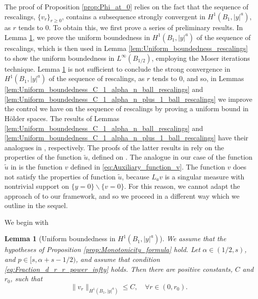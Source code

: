 \documentclass[11pt,reqno]{amsart}
\newtheorem{lem}[thm]{Lemma}
\theoremstyle{definition}
\theoremstyle{remark}
\begin{document}
The proof of Proposition \ref{prop:Phi_at_0} relies on the fact that the sequence of rescalings, $\{v_r\}_{r \geq 0}$, contains a subsequence strongly convergent in $H^1(B_1,|y|^a)$, as $r$ tends to $0$. To obtain this, we first prove a series of preliminary results. In Lemma \ref{lem:Uniform_boundedness_H_1_rescalings}, we prove the uniform boundedness in $H^1(B_1,|y|^a)$ of the sequence of rescalings, which is then used in Lemma \ref{lem:Uniform_boundedness_rescalings} to show the uniform boundedness in $L^{\infty}(B_{1/2})$, employing the Moser iterations technique. Lemma \ref{lem:Uniform_boundedness_H_1_rescalings} is not sufficient to conclude the strong convergence in $H^1(B_1,|y|^a)$ of the sequence of rescalings, as $r$ tends to $0$, and so, in Lemmas \ref{lem:Uniform_boundedness_C_1_alpha_n_ball_rescalings} and \ref{lem:Uniform_boundedness_C_1_alpha_n_plus_1_ball_rescalings} we improve the control we have on the sequence of rescalings by proving a uniform bound in H\"older spaces. The results of Lemmas \ref{lem:Uniform_boundedness_C_1_alpha_n_ball_rescalings} and \ref{lem:Uniform_boundedness_C_1_alpha_n_plus_1_ball_rescalings} have their analogues in \cite[Lemma 4.1 and Proposition 4.3]{Caffarelli_Salsa_Silvestre_2008}, respectively. The proofs of the latter results in \cite{Caffarelli_Salsa_Silvestre_2008} rely on the properties of the function $\widetilde u$, defined on \cite[p. 433]{Caffarelli_Salsa_Silvestre_2008}. The analogue in our case of the function $\widetilde u$ in \cite{Caffarelli_Salsa_Silvestre_2008} is the function $v$ defined in \eqref{eq:Auxiliary_function_v}. The function $v$ does not satisfy the properties  of function $\widetilde u$, because $L_a v$ is a singular measure with nontrivial support on $\{y=0\}\backslash\{v=0\}$. For this reason, we cannot adapt the approach of \cite{Caffarelli_Salsa_Silvestre_2008} to our framework, and so we proceed in a different way which we outline in the sequel.

We begin with
\begin{lem}[Uniform boundedness in $H^1(B_1,|y|^a)$]
\label{lem:Uniform_boundedness_H_1_rescalings}
We assume that the hypotheses of Proposition \ref{prop:Monotonicity_formula} hold. Let $\alpha\in (1/2,s)$, and $p \in [s,\alpha+s-1/2)$, and assume that condition \eqref{eq:Fraction_d_r_r_power_infty} holds. Then there are positive constants, $C$ and $r_0$, such that
\begin{equation}
\label{eq:Uniform_boundedness_H_1_rescalings}
\|v_r\|_{H^{1}(B_1,|y|^a)} \leq C,\quad\forall r\in (0,r_0).
\end{equation}
\end{lem} 
\end{document}
